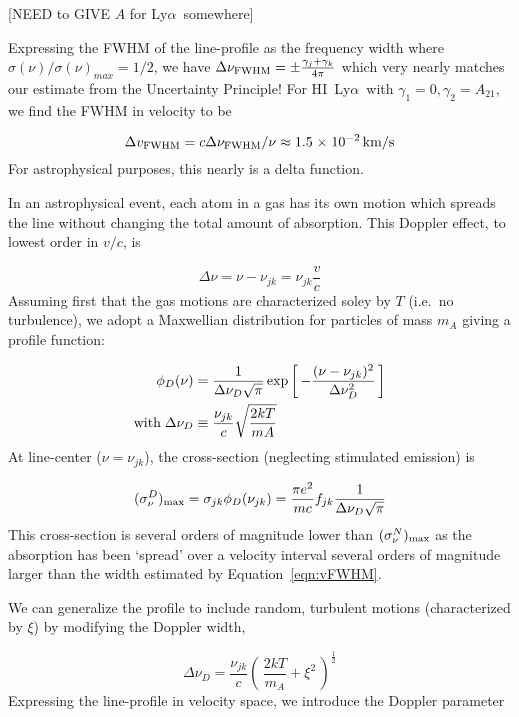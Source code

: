 \documentclass[graybox]{svmult}
\newcommand{\HI}{H{\sc I}}
\def\lya{Ly$\alpha$}
\def\ohf{\frac{1}{2}}
\def\ltk{\left [ \,}
\def\ltp{\left ( \,}
\def\rtk{\, \right  ] }
\def\rtp{\, \right  ) }
\def\sci#1{{\; \times \; 10^{#1}}}
\begin{document}
[NEED to GIVE $A$ for \lya\ somewhere]

Expressing the FWHM of the line-profile as 
the frequency width where $\sigma(\nu)/\sigma(\nu)_{max} = 1/2$,
we have $\Delta\nu_{\rm FWHM} = \pm \frac{\gamma_j + \gamma_k}{4\pi}$
which very nearly matches our estimate from the
Uncertainty Principle!
For \HI\ \lya\ with $\gamma_1=0, \gamma_2=A_{21}$,
we find the FWHM in velocity to be 

\begin{equation}
\Delta v_{\rm FWHM} = c \Delta\nu_{\rm FWHM}/\nu
\approx 1.5\sci{-2} \, {\rm km/s}  
\label{eqn:vFWHM}
\end{equation}
For astrophysical purposes,
this nearly is a delta function.

In an astrophysical event, each 
atom in a gas has its own motion 
which spreads the line without changing the total 
amount of absorption.  
This Doppler effect, to lowest order in $v/c$, is

\begin{equation}
\Delta\nu = \nu - \nu_{jk} = \nu_{jk} \frac{v}{c}
\end{equation}
Assuming first that the gas motions are characterized
soley by $T$ (i.e.\ no turbulence),
we adopt a Maxwellian distribution for particles of mass $m_A$
giving a profile function:

\begin{align}
\phi_D(\nu) &= \frac{1}{\Delta \nu_D \sqrt{\pi}} 
\exp \ltk - \frac{(\nu - \nu_{jk})^2}{\Delta \nu_D^2} \rtk \\
{\rm with} \; \Delta \nu_D &\equiv \frac{\nu_{jk}}{c} \sqrt{\frac{2kT}{mA}}
\end{align}
At line-center ($\nu = \nu_{jk}$),
the cross-section (neglecting stimulated emission) is

\begin{equation}
(\sigma_\nu^D)_{\rm max} = \sigma_{jk} \phi_D(\nu_{jk})  
	= \frac{\pi e^2}{mc} f_{jk} \frac{1}{\Delta \nu_D \sqrt{\pi}}
\label{eqn:Dlinecenter}
\end{equation}
This cross-section is several orders of magnitude
lower than $(\sigma_\nu^N)_{\rm max}$ as the absorption has
been `spread' over a velocity interval several orders of
magnitude larger than the width estimated by Equation~\ref{eqn:vFWHM}.

We can generalize the profile to include random, turbulent
motions (characterized by $\xi$)
by modifying the Doppler width,

\begin{equation}
\Delta\nu_D = \frac{\nu_{jk}}{c} \ltp \frac{2kT}{m_A} + 
\xi^2 \rtp^\ohf
\end{equation}
Expressing the line-profile in velocity space, we introduce
the Doppler parameter
\end{document}
